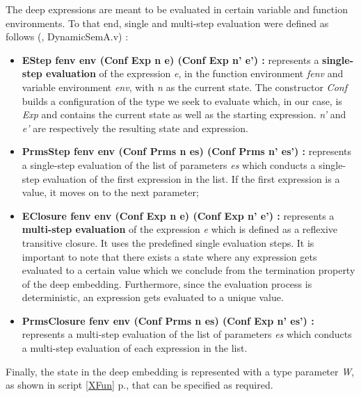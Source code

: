 The deep expressions are meant to be evaluated in certain variable and function environments. To that end, single and multi-step evaluation were defined as follows (\cite{DEC}, DynamicSemA.v) :
\begin{itemize}
	\item \textbf{EStep fenv env (Conf Exp n e) (Conf Exp n' e') :} represents a \textbf{single-step evaluation} of the expression \textit{e}, in the function environment \textit{fenv} and variable environment \textit{env}, with \textit{n} as the current state. The constructor \textit{Conf} builds a configuration of the type we seek to evaluate which, in our case, is \textit{Exp} and contains the current state as well as the starting expression. \textit{n'} and \textit{e'} are respectively the resulting state and expression. \pagebreak
\item \textbf{PrmsStep fenv env (Conf Prms n es) (Conf Prms n' es') :} represents a single-step evaluation of the list of parameters \textit{es} which conducts a single-step evaluation of the first expression in the list. If the first expression is a value, it moves on to the next parameter;
\item \textbf{EClosure fenv env (Conf Exp n e) (Conf Exp n' e') :} represents a \textbf{multi-step evaluation} of the expression \textit{e} which is defined as a reflexive transitive closure. It uses the predefined single evaluation steps. It is important to note that there exists a state where any expression gets evaluated to a certain value which we conclude from the termination property of the deep embedding. Furthermore, since the evaluation process is deterministic, an expression gets evaluated to a unique value. 
\item \textbf{PrmsClosure fenv env (Conf Prms n es) (Conf Exp n' es') :} represents a multi-step evaluation of the list of parameters \textit{es} which conducts a multi-step evaluation of each expression in the list.
\end{itemize}

Finally, the state in the deep embedding is represented with a type parameter \textit{W}, as shown in script \ref{XFun} p.\pageref{XFun}, that can be specified as required. 

